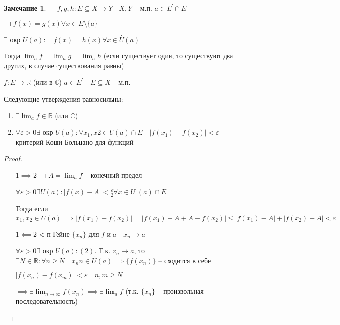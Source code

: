 \documentclass{book}
\newcommand\R{\ensuremath{\mathbb{R}}}
\renewcommand\C{\ensuremath{\mathbb{C}}}
\newcommand{\p}[1]{#1^{\prime}}
\theoremstyle{definition}
\newtheorem*{note}{Замечание}
\begin{document}
    \begin{note}
        $\sqsupset f, g, h:E\subseteq X \to Y\quad X, Y$ -- м.п. $a\in \p E\cap E$

        $\sqsupset f(x) = g(x) \forall x\in E\setminus \{a\}$

        $\exists $ окр $U(a):\quad f(x) = h(x)\forall x\in \overset{\cdot}U(a)$

        Тогда $\lim_{a} f = \lim_ag = \lim_ah$ (если существует один, то существуют два других, в случае существования равны)
    \end{note}

\begin{theorem}
    $f:E\to \R$ (или в $\C$) $a\in \p E\quad E\subseteq X$ -- м.п.

    Следующие утверждения равносильны:
    \begin{enumerate}
        \item $\exists \lim_af\in \R$ (или $\C$)
        \item $\forall \varepsilon>0\exists $ окр $U(a):\forall x_1,x 2\in \overset{\cdot }U(a)\cap E\quad \left| f(x_1) - f(x_2) \right| <\varepsilon$ -- критерий Коши-Больцано для функций
    \end{enumerate}
\end{theorem}
\begin{proof}
    \begin{itemize}
        \item []
        \item [$1\implies 2$] $\sqsupset A = \lim_af$ -- конечный предел

            $\forall \varepsilon>0\exists U(a):\left| f(x)-A \right| <\frac{\varepsilon}{2} \forall x\in \p U(a)\cap E$ 

            Тогда если $x_1, x_2\in \overset{\cdot }U(a) \implies \left| f(x_1) - f(x_2) \right| = \left| f(x_1)-A+A-f(x_2) \right| \leqslant \left| f(x_1)-A \right|  + \left| f(x_2)-A \right| <\varepsilon$
        \item [$1\impliedby 2$] $\sphericalangle $ п Гейне $\{x_{n} \}$ для $f$ и  $a\quad x_{n} \to a$

            $\forall \varepsilon>0\exists$ окр $U(a):(2)$. Т.к. $x_{n} \to a$, то $\exists N\in \R: \forall n\geqslant N\quad x_{n} n\in \overset{\cdot }U(a) \implies \{f(x_{n} )\}$ -- сходится в себе

            $\left| f(x_{n} ) - f(x_{m} ) \right| <\varepsilon\quad n, m\geqslant N$

            $\implies \exists \lim_{n \to \infty} f(x_{n} ) \implies \exists \lim_a f$ (т.к. $\{x_{n} \}$ -- произвольная последовательность)
    \end{itemize}
\end{proof}
\end{document}
